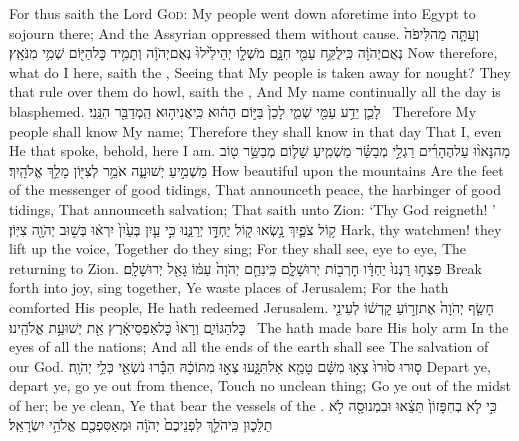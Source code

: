 {For thus saith the Lord \textsc{God}: My people went down aforetime into Egypt to sojourn there; And the Assyrian oppressed them without cause.}
{וְעַתָּ֤ה מַה\maqqaf לִּי\maqqaf פֹה֙ נְאֻם\maqqaf יְהֹוָ֔ה כִּֽי\maqqaf לֻקַּ֥ח עַמִּ֖י חִנָּ֑ם מֹשְׁלָ֤ו יְהֵילִ֙ילוּ֙ נְאֻם\maqqaf יְהֹוָ֔ה וְתָמִ֥יד כׇּל\maqqaf הַיּ֖וֹם שְׁמִ֥י מִנֹּאָֽץ׃}
{Now therefore, what do I here, saith the \lord, Seeing that My people is taken away for nought? They that rule over them do howl, saith the \lord, And My name continually all the day is blasphemed.}
{לָכֵ֛ן יֵדַ֥ע עַמִּ֖י שְׁמִ֑י לָכֵן֙ בַּיּ֣וֹם הַה֔וּא כִּֽי\maqqaf אֲנִי\maqqaf ה֥וּא הַֽמְדַבֵּ֖ר הִנֵּֽנִי׃ \setuma }
{Therefore My people shall know My name; Therefore they shall know in that day That I, even He that spoke, behold, here I am.}
{מַה\maqqaf נָּאו֨וּ עַל\maqqaf הֶהָרִ֜ים רַגְלֵ֣י מְבַשֵּׂ֗ר מַשְׁמִ֧יעַ שָׁל֛וֹם מְבַשֵּׂ֥ר ט֖וֹב מַשְׁמִ֣יעַ יְשׁוּעָ֑ה אֹמֵ֥ר לְצִיּ֖וֹן מָלַ֥ךְ אֱלֹהָֽיִךְ׃}
{How beautiful upon the mountains Are the feet of the messenger of good tidings, That announceth peace, the harbinger of good tidings, That announceth salvation; That saith unto Zion: ‘Thy God reigneth! ’}
{ק֥וֹל צֹפַ֛יִךְ נָ֥שְׂאוּ ק֖וֹל יַחְדָּ֣ו יְרַנֵּ֑נוּ כִּ֣י עַ֤יִן בְּעַ֙יִן֙ יִרְא֔וּ בְּשׁ֥וּב יְהֹוָ֖ה צִיּֽוֹן׃}
{Hark, thy watchmen! they lift up the voice, Together do they sing; For they shall see, eye to eye, The \lord\space returning to Zion.}
{פִּצְח֤וּ רַנְּנוּ֙ יַחְדָּ֔ו חׇרְב֖וֹת יְרוּשָׁלָ֑͏ִם כִּֽי\maqqaf נִחַ֤ם יְהֹוָה֙ עַמּ֔וֹ גָּאַ֖ל יְרוּשָׁלָֽ͏ִם׃}
{Break forth into joy, sing together, Ye waste places of Jerusalem; For the \lord\space hath comforted His people, He hath redeemed Jerusalem.}
{חָשַׂ֤ף יְהֹוָה֙ אֶת\maqqaf זְר֣וֹעַ קׇדְשׁ֔וֹ לְעֵינֵ֖י כׇּל\maqqaf הַגּוֹיִ֑ם וְרָאוּ֙ כׇּל\maqqaf אַפְסֵי\maqqaf אָ֔רֶץ אֵ֖ת יְשׁוּעַ֥ת אֱלֹהֵֽינוּ׃ \setuma }
{The \lord\space hath made bare His holy arm In the eyes of all the nations; And all the ends of the earth shall see The salvation of our God.}
{ס֤וּרוּ ס֙וּרוּ֙ צְא֣וּ מִשָּׁ֔ם טָמֵ֖א אַל\maqqaf תִּגָּ֑עוּ צְא֣וּ מִתּוֹכָ֔הּ הִבָּ֕רוּ נֹשְׂאֵ֖י כְּלֵ֥י יְהֹוָֽה׃}
{Depart ye, depart ye, go ye out from thence, Touch no unclean thing; Go ye out of the midst of her; be ye clean, Ye that bear the vessels of the \lord.}
{כִּ֣י לֹ֤א בְחִפָּזוֹן֙ תֵּצֵ֔אוּ וּבִמְנוּסָ֖ה לֹ֣א תֵלֵכ֑וּן כִּֽי\maqqaf הֹלֵ֤ךְ לִפְנֵיכֶם֙ יְהֹוָ֔ה וּמְאַסִּפְכֶ֖ם אֱלֹהֵ֥י יִשְׂרָאֵֽל׃ \setuma }
